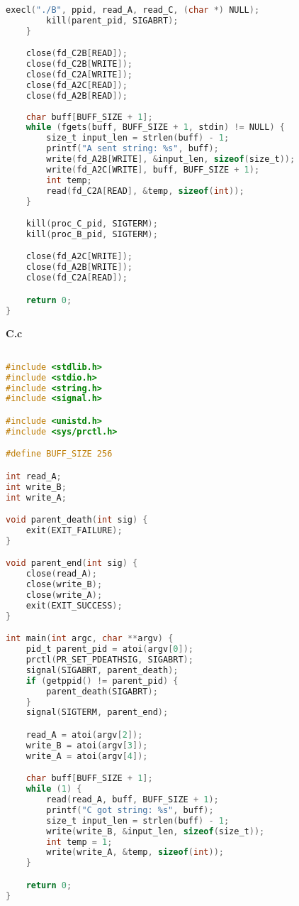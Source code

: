 \begin{lstlisting}[language=C]
        execl("./B", ppid, read_A, read_C, (char *) NULL);
        kill(parent_pid, SIGABRT);
    }

    close(fd_C2B[READ]);
    close(fd_C2B[WRITE]);
    close(fd_C2A[WRITE]);
    close(fd_A2C[READ]);
    close(fd_A2B[READ]);
    
    char buff[BUFF_SIZE + 1];
    while (fgets(buff, BUFF_SIZE + 1, stdin) != NULL) {
        size_t input_len = strlen(buff) - 1;
        printf("A sent string: %s", buff);
        write(fd_A2B[WRITE], &input_len, sizeof(size_t));
        write(fd_A2C[WRITE], buff, BUFF_SIZE + 1);
        int temp;
        read(fd_C2A[READ], &temp, sizeof(int));
    }

    kill(proc_C_pid, SIGTERM);
    kill(proc_B_pid, SIGTERM);

    close(fd_A2C[WRITE]);
    close(fd_A2B[WRITE]);
    close(fd_C2A[READ]);

    return 0;
}

\end{lstlisting}

\textbf{C.c}

\begin{lstlisting}[language=C]

#include <stdlib.h>
#include <stdio.h>
#include <string.h>
#include <signal.h>

#include <unistd.h>
#include <sys/prctl.h>

#define BUFF_SIZE 256

int read_A;
int write_B;
int write_A;

void parent_death(int sig) {
    exit(EXIT_FAILURE);
}

void parent_end(int sig) {
    close(read_A);
    close(write_B);
    close(write_A);
    exit(EXIT_SUCCESS);
}

int main(int argc, char **argv) {
    pid_t parent_pid = atoi(argv[0]);
    prctl(PR_SET_PDEATHSIG, SIGABRT);
    signal(SIGABRT, parent_death);
    if (getppid() != parent_pid) {
        parent_death(SIGABRT);
    }
    signal(SIGTERM, parent_end);

    read_A = atoi(argv[2]);
    write_B = atoi(argv[3]);
    write_A = atoi(argv[4]);

    char buff[BUFF_SIZE + 1];
    while (1) {
        read(read_A, buff, BUFF_SIZE + 1);
        printf("C got string: %s", buff);
        size_t input_len = strlen(buff) - 1;
        write(write_B, &input_len, sizeof(size_t));
        int temp = 1;
        write(write_A, &temp, sizeof(int));  
    }

    return 0;
}

\end{lstlisting}


